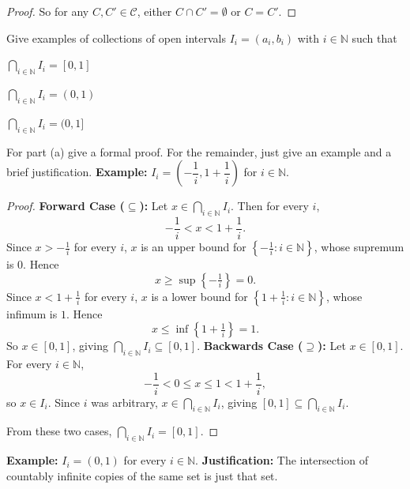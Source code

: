 \documentclass{homework}
\newcommand{\Nats}{\ensuremath{\mathbb N}} %
\begin{document}
\begin{problems}
\begin{proof}
    So for any $C, C' \in \mathcal{C}$, either $C \cap C' = \emptyset$ or $C = C'$.
\end{proof}

\problem Give examples of collections of open intervals $I_i = (a_i, b_i)$ with $i \in \Nats$ such that
\begin{subproblems}
\item $\bigcap_{i \in \Nats} I_i = [0,1]$
\item $\bigcap_{i \in \Nats} I_i = (0,1)$
\item $\bigcap_{i \in \Nats} I_i = (0,1]$
\end{subproblems}
For part (a) give a formal proof. For the remainder, just give an example and a brief
justification.
\subsol
  \textbf{Example:} $I_i = \left(-\dfrac{1}{i}, 1 + \dfrac{1}{i}\right)$ for $i \in \Nats$.
  \begin{proof}
$ $\newline \textbf{Forward Case ($\subseteq$):} Let $x \in \bigcap_{i\in\Nats} I_i$. Then for every $i$,
    \[
    -\frac1i < x < 1+\frac1i.
    \]
    Since $x > -\frac1i$ for every $i$, $x$ is an upper bound for $\left\{-\frac1i : i \in \Nats\right\}$, whose supremum is $0$. Hence
    \[
    x \ge \sup\left\{-\tfrac1i\right\} = 0.
    \]
    Since $x < 1+\frac1i$ for every $i$, $x$ is a lower bound for $\left\{1+\frac1i : i \in \Nats\right\}$, whose infimum is $1$. Hence
    \[
    x \le \inf\left\{1+\tfrac1i\right\} = 1.
    \]
    So $x \in [0,1]$, giving $\bigcap_{i\in\Nats} I_i \subseteq [0,1]$. \newline
    \textbf{Backwards Case ($\supseteq$):} Let $x \in [0,1]$. For every $i \in \Nats$,
    \[
    -\frac1i < 0 \le x \le 1 < 1+\frac1i,
    \]
    so $x \in I_i$. Since $i$ was arbitrary, $x \in \bigcap_{i\in\Nats} I_i$, giving $[0,1] \subseteq \bigcap_{i\in\Nats} I_i$.
 
    From these two cases, $\bigcap_{i \in \Nats} I_i = [0,1]$.
  \end{proof}


\subsol
  \textbf{Example:} $I_i = (0,1)$ for every $i \in \Nats$. \newline
  \textbf{Justification:} The intersection of countably infinite copies of the same set is just that set.


\end{problems}
\end{document}
